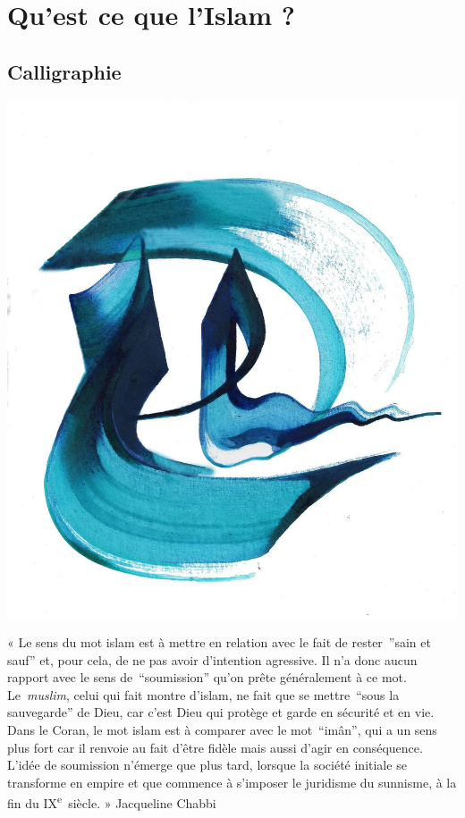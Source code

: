 \chapter{Qu'est ce que l'Islam ?}

\section{Calligraphie}

\includegraphics[width=\textwidth]{Images/image011.png}

« Le sens du mot islam est à mettre en relation avec le fait de
rester~''sain et sauf'' et, pour cela, de ne pas avoir d'intention
agressive. Il n'a donc aucun rapport avec le sens de~``soumission''
qu'on prête généralement à ce mot. Le~\emph{muslim}, celui qui fait
montre d'islam, ne fait que se mettre~``sous la sauvegarde'' de Dieu,
car c'est Dieu qui protège et garde en sécurité et en vie. Dans le
Coran, le mot islam est à comparer avec le mot~``imân'', qui a un sens
plus fort car il renvoie au fait d'être fidèle mais aussi d'agir en
conséquence. L'idée de soumission n'émerge que plus tard, lorsque la
société initiale se transforme en empire et que commence à s'imposer le
juridisme du sunnisme, à la fin du IX\textsuperscript{e}~siècle. » Jacqueline Chabbi



